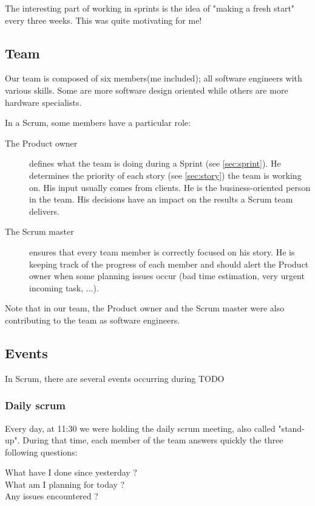 The interesting part of working in sprints is the idea of "making a fresh start" every three weeks. This
was quite motivating for me!


\subsection{Team}
Our team is composed of six members(me included); all software engineers with various
skills. Some are more software design oriented while others are more hardware
specialists.

In a Scrum, some members have a particular role:
\begin{description}
    \item[The Product owner]
        defines what the team is doing during a Sprint (see \ref{sec:sprint}).
        He determines the priority of each story (see \ref{sec:story}) the team is working on. His input usually comes from
        clients. He is the business-oriented person in the team. His decisions have an impact on the results a Scrum team delivers.
    \item[The Scrum master]
        ensures that every team member is correctly focused on his story. He is keeping track of the progress of each member and
        should alert the Product owner when some planning issues occur (bad time estimation, very urgent incoming task, ...).
\end{description}

Note that in our team, the Product owner and the Scrum master were also contributing to the team as software engineers.

\subsection{Events}
In Scrum, there are several events occurring during TODO

\subsubsection{Daily scrum}
Every day, at 11:30 we were holding the daily scrum meeting, also called "stand-up".
During that time, each member of the team answers quickly the three following questions:

\begin{description}
    \item[What have I done since yesterday ?]
    \item[What am I planning for today ?]
    \item[Any issues encountered ?]
\end{description}

